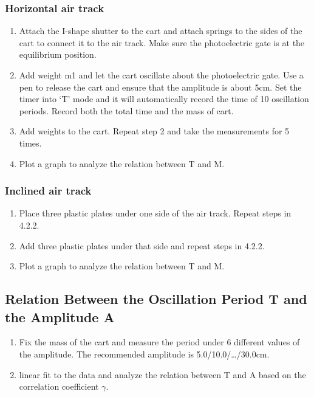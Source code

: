 \documentclass[12pt,a4paper]{article}
\begin{document}
\subsubsection{Horizontal air track}
\begin{enumerate}[1.]
    \item Attach the I-shape shutter to the cart and attach springs to the sides of the cart to connect it to the air track. Make sure the photoelectric gate is at the equilibrium position.
    \item Add weight m1 and let the cart oscillate about the photoelectric gate. Use a pen to release the cart and ensure that the amplitude is about 5cm. Set the timer into ‘T’ mode and it will automatically record the time of 10 oscillation periods. Record both the total time and the mass of cart. 
    \item Add weights to the cart. Repeat step 2 and take the measurements for 5 times.
    \item Plot a graph to analyze the relation between T and M.  
\end{enumerate}

\subsubsection{Inclined air track}
\begin{enumerate}[1.]
    \item Place three plastic plates under one side of the air track. Repeat steps in 4.2.2.
    \item Add three plastic plates under that side and repeat steps in 4.2.2.
    \item Plot a graph to analyze the relation between T and M. 
\end{enumerate}

\subsection{Relation Between the Oscillation Period T and the Amplitude A}
\begin{enumerate}[1.]
    \item  Fix the mass of the cart and measure the period under 6 different values of the amplitude. The recommended amplitude is 5.0/10.0/…/30.0cm.
    \item linear fit to the data and analyze the relation between T and A based on the correlation coefficient $\gamma$.
\end{enumerate}
\end{document}
